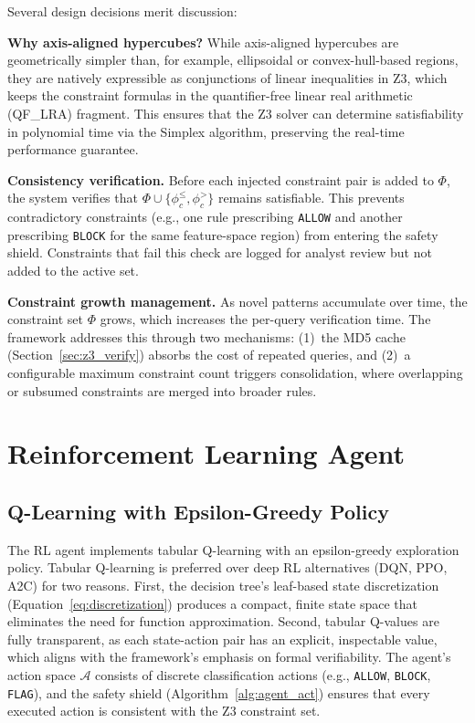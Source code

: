 \documentclass[12pt, letterpaper, oneside]{report}
\begin{document}
Several design decisions merit discussion:

\textbf{Why axis-aligned hypercubes?} While axis-aligned hypercubes are geometrically simpler than, for example, ellipsoidal or convex-hull-based regions, they are natively expressible as conjunctions of linear inequalities in Z3, which keeps the constraint formulas in the quantifier-free linear real arithmetic (QF\_LRA) fragment. This ensures that the Z3 solver can determine satisfiability in polynomial time via the Simplex algorithm, preserving the real-time performance guarantee.

\textbf{Consistency verification.} Before each injected constraint pair is added to $\Phi$, the system verifies that $\Phi \cup \{\phi_c^{\leq}, \phi_c^{>}\}$ remains satisfiable. This prevents contradictory constraints (e.g., one rule prescribing \texttt{ALLOW} and another prescribing \texttt{BLOCK} for the same feature-space region) from entering the safety shield. Constraints that fail this check are logged for analyst review but not added to the active set.

\textbf{Constraint growth management.} As novel patterns accumulate over time, the constraint set $\Phi$ grows, which increases the per-query verification time. The framework addresses this through two mechanisms: (1)~the MD5 cache (Section~\ref{sec:z3_verify}) absorbs the cost of repeated queries, and (2)~a configurable maximum constraint count triggers consolidation, where overlapping or subsumed constraints are merged into broader rules.


\section{Reinforcement Learning Agent}
\label{sec:rl_agent}

\subsection{Q-Learning with Epsilon-Greedy Policy}

The RL agent implements tabular Q-learning with an epsilon-greedy exploration policy. Tabular Q-learning is preferred over deep RL alternatives (DQN, PPO, A2C) for two reasons. First, the decision tree's leaf-based state discretization (Equation~\ref{eq:discretization}) produces a compact, finite state space that eliminates the need for function approximation. Second, tabular Q-values are fully transparent, as each state-action pair has an explicit, inspectable value, which aligns with the framework's emphasis on formal verifiability. The agent's action space $\mathcal{A}$ consists of discrete classification actions (e.g., \texttt{ALLOW}, \texttt{BLOCK}, \texttt{FLAG}), and the safety shield (Algorithm~\ref{alg:agent_act}) ensures that every executed action is consistent with the Z3 constraint set.
\end{document}

